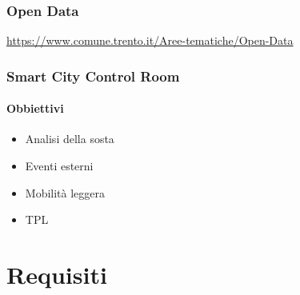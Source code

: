         \subsubsection{Open Data}
            \href{https://www.comune.trento.it/Aree-tematiche/Open-Data}{https://www.comune.trento.it/Aree-tematiche/Open-Data} 
        \subsubsection{Smart City Control Room}
            \paragraph{Obbiettivi}
                \begin{itemize}
                    \item Analisi della sosta
                    \item Eventi esterni
                    \item Mobilità leggera
                    \item TPL
                \end{itemize}
    \section{Requisiti}
